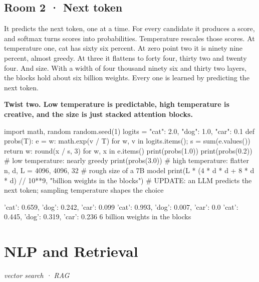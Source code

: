 \documentclass[11pt,a4paper]{report}
\begin{document}
\section*{Room 2 · Next token}
It predicts the next token, one at a time. For every candidate it produces a score, and softmax turns scores into probabilities. Temperature rescales those scores. At temperature one, cat has sixty six percent. At zero point two it is ninety nine percent, almost greedy. At three it flattens to forty four, thirty two and twenty four. And size. With a width of four thousand ninety six and thirty two layers, the blocks hold about six billion weights. Every one is learned by predicting the next token.
\begin{tcolorbox}[colback=yellow!12,colframe=orange!70!black,boxrule=0.4pt,left=4pt,right=4pt,top=2pt,bottom=2pt]\textbf{Twist two. Low temperature is predictable, high temperature is creative, and the size is just stacked attention blocks.}\end{tcolorbox}
\begin{Code}
import math, random
random.seed(1)
logits = {"cat": 2.0, "dog": 1.0, "car": 0.1}
def probs(T):
    e = {w: math.exp(v / T) for w, v in logits.items()}; s = sum(e.values())
    return {w: round(x / s, 3) for w, x in e.items()}
print(probs(1.0))
print(probs(0.2))                           # low temperature: nearly greedy
print(probs(3.0))                           # high temperature: flatter
n, d, L = 4096, 4096, 32                    # rough size of a 7B model
print(L * (4 * d * d + 8 * d * d) // 10**9, "billion weights in the blocks")
# UPDATE: an LLM predicts the next token; sampling temperature shapes the choice
\end{Code}
\begin{Out}
{'cat': 0.659, 'dog': 0.242, 'car': 0.099}
{'cat': 0.993, 'dog': 0.007, 'car': 0.0}
{'cat': 0.445, 'dog': 0.319, 'car': 0.236}
6 billion weights in the blocks
\end{Out}
\chapter{NLP and Retrieval}
\textit{vector search · RAG}
\end{document}
